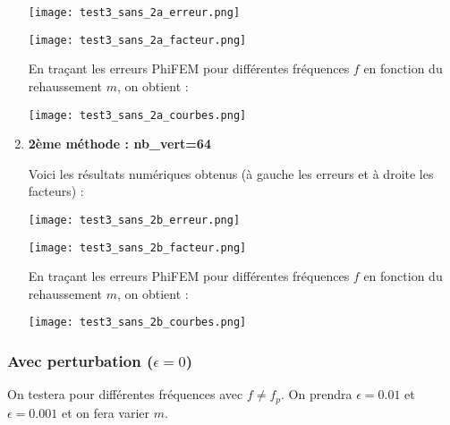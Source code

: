 \begin{enumerate}[label=\textbullet]
	\begin{minipage}{0.48\linewidth}
		\centering
		\texttt{[image: test3\_sans\_2a\_erreur.png]}
	\end{minipage}
	\begin{minipage}{0.48\linewidth}
		\centering
		\texttt{[image: test3\_sans\_2a\_facteur.png]}
	\end{minipage}
	
	En traçant les erreurs PhiFEM pour différentes fréquences $f$ en fonction du rehaussement $m$, on obtient :
	
	\begin{minipage}{\linewidth}
		\centering
		\texttt{[image: test3\_sans\_2a\_courbes.png]}
	\end{minipage}
	
	\newpage
	\item \textbf{2ème méthode : nb\_vert=64}
	
	Voici les résultats numériques obtenus (à gauche les erreurs et à droite les facteurs) :
	
	\begin{minipage}{0.48\linewidth}
		\centering
		\texttt{[image: test3\_sans\_2b\_erreur.png]}
	\end{minipage}
	\begin{minipage}{0.48\linewidth}
		\centering
		\texttt{[image: test3\_sans\_2b\_facteur.png]}
	\end{minipage}
	
	En traçant les erreurs PhiFEM pour différentes fréquences $f$ en fonction du rehaussement $m$, on obtient :
	
	\begin{minipage}{\linewidth}
		\centering
		\texttt{[image: test3\_sans\_2b\_courbes.png]}
	\end{minipage}
	
\end{enumerate}


\subsubsection*{Avec perturbation ($\epsilon=0$)}


On testera pour différentes fréquences avec $f\ne f_p$. On prendra $\epsilon=0.01$ et $\epsilon=0.001$ et on fera varier $m$.

